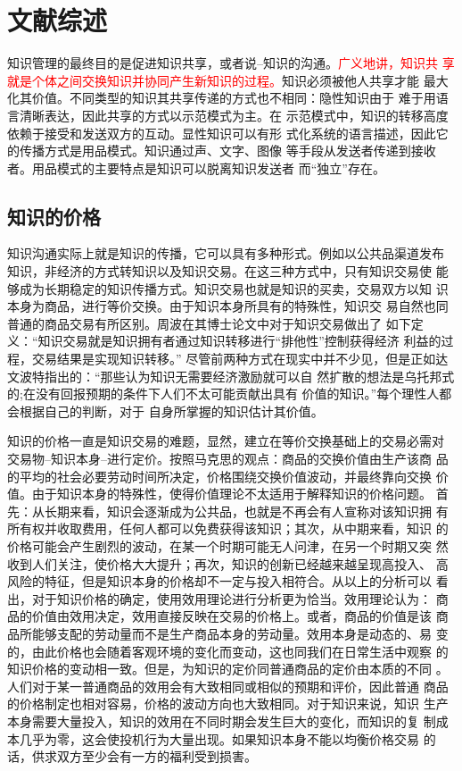 \documentclass[12pt,a4paper]{Ctexart}
\begin{document}
\section{文献综述}

知识管理的最终目的是促进知识共享，或者说--知识的沟通。\textcolor{red}{广义地讲，知识共
享就是个体之间交换知识并协同产生新知识的过程。}知识必须被他人共享才能
最大化其价值。不同类型的知识其共享传递的方式也不相同：隐性知识由于
难于用语言清晰表达，因此共享的方式以示范模式为主。在
示范模式中，知识的转移高度依赖于接受和发送双方的互动。\cite{zhoubo2006}显性知识可以有形
式化系统的语言描述，因此它的传播方式是用品模式。知识通过声、文字、图像
等手段从发送者传递到接收者。用品模式的主要特点是知识可以脱离知识发送者
而“独立”存在。\cite{zhoubo2006}

\subsection{知识的价格}

知识沟通实际上就是知识的传播，它可以具有多种形式。例如以公共品渠道发布
知识，非经济的方式转知识以及知识交易。在这三种方式中，只有知识交易使
能够成为长期稳定的知识传播方式。知识交易也就是知识的买卖，交易双方以知
识本身为商品，进行等价交换。由于知识本身所具有的特殊性，知识交
易自然也同普通的商品交易有所区别。周波在其博士论文中对于知识交易做出了
如下定义：“知识交易就是知识拥有者通过知识转移进行“排他性”控制获得经济
利益的过程，交易结果是实现知识转移。”\cite{zhoubo2006}
尽管前两种方式在现实中并不少见，但是正如达
文波特指出的：“那些认为知识无需要经济激励就可以自
然扩散的想法是乌托邦式的;在没有回报预期的条件下人们不太可能贡献出具有
价值的知识。”\cite{davenport1998wko}每个理性人都会根据自己的判断，对于
自身所掌握的知识估计其价值。

知识的价格一直是知识交易的难题，显然，建立在等价交换基础上的交易必需对
交易物--知识本身--进行定价。按照马克思的观点：商品的交换价值由生产该商
品的平均的社会必要劳动时间所决定，价格围绕交换价值波动，并最终靠向交换
价值。由于知识本身的特殊性，使得价值理论不太适用于解释知识的价格问题。
首先：从长期来看，知识会逐渐成为公共品，也就是不再会有人宣称对该知识拥
有所有权并收取费用，任何人都可以免费获得该知识；其次，从中期来看，知识
的价格可能会产生剧烈的波动，在某一个时期可能无人问津，在另一个时期又突
然收到人们关注，使价格大大提升；再次，知识的创新已经越来越呈现高投入、
高风险的特征，但是知识本身的价格却不一定与投入相符合。从以上的分析可以
看出，对于知识价格的确定，使用效用理论进行分析更为恰当。效用理论认为：
商品的价值由效用决定，效用直接反映在交易的价格上。或者，商品的价值是该
商品所能够支配的劳动量而不是生产商品本身的劳动量。效用本身是动态的、易
变的，由此价格也会随着客观环境的变化而变动，这也同我们在日常生活中观察
的知识价格的变动相一致。但是，为知识的定价同普通商品的定价由本质的不同
。人们对于某一普通商品的效用会有大致相同或相似的预期和评价，因此普通
商品的价格制定也相对容易，价格的波动方向也大致相同。对于知识来说，知识
生产本身需要大量投入，知识的效用在不同时期会发生巨大的变化，而知识的复
制成本几乎为零，这会使投机行为大量出现。如果知识本身不能以均衡价格交易
的话，供求双方至少会有一方的福利受到损害。
\end{document}
